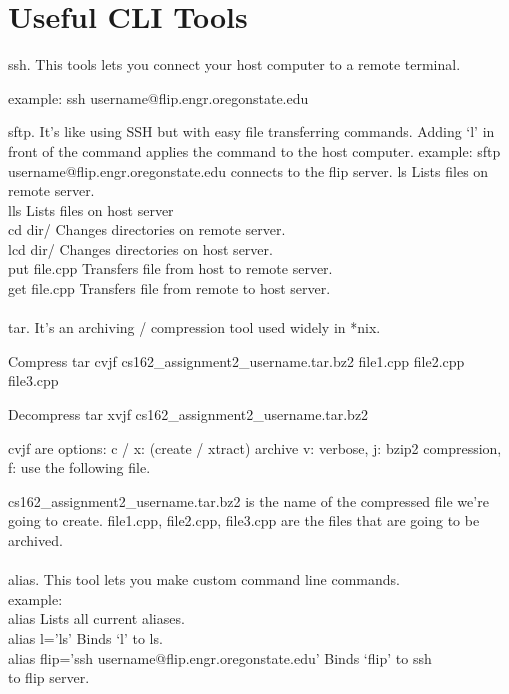 \documentclass[letterpaper,10pt,titlepage,fleqn]{article}
\begin{document}
\section{Useful CLI Tools}
ssh. This tools lets you connect your host computer to a remote terminal.

example:
ssh username@flip.engr.oregonstate.edu

sftp. It’s like using SSH but with easy file transferring commands. Adding ‘l’
in front of the command applies the command to the host computer. 
example:
sftp username@flip.engr.oregonstate.edu    connects to the flip server.
ls                        Lists files on remote server.\\
lls                        Lists files on host server\\
cd dir/                        Changes directories on remote server.\\
lcd dir/                        Changes directories on host server.\\
put file.cpp                    Transfers file from host to remote server.\\
get file.cpp                    Transfers file from remote to host server.\\
\\ 
tar. It's an archiving / compression tool used widely in *nix.

Compress
tar cvjf cs162\_assignment2\_username.tar.bz2 file1.cpp file2.cpp file3.cpp

Decompress
tar xvjf cs162\_assignment2\_username.tar.bz2

cvjf are options: 
c / x:		(create / xtract) archive
v:			verbose, 
j:			bzip2 compression, 
f:			use the following file.

cs162\_assignment2\_username.tar.bz2 is the name of the compressed file we’re
going to create. file1.cpp, file2.cpp, file3.cpp are the files that are going to
be archived.    \\
\\
alias. This tool lets you make custom command line commands. \\
example:\\
alias                                Lists all current aliases. \\
alias l=’ls’                            Binds ‘l’ to ls.\\
alias flip=’ssh username@flip.engr.oregonstate.edu’        Binds ‘flip’ to ssh\\
to flip server.\\
\end{document}
